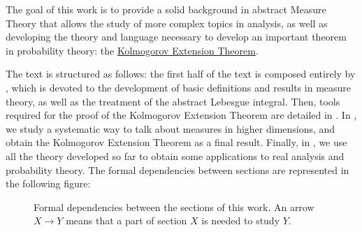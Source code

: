 The goal of this work is to provide a solid background in abstract Measure Theory that allows the study of more complex topics in analysis, as well as developing the theory and language necessary to develop an important theorem in probability theory: the \hyperref[theorem:Kolmogorov Extension]{Kolmogorov Extension Theorem}.


The text is structured as follows: the first half of the text is composed entirely by , which is devoted to the development of basic definitions and results in measure theory, as well as the treatment of the abstract Lebesgue integral. Then, tools required for the proof of the Kolmogorov Extension Theorem are detailed in . In , we study a systematic way to talk about measures in higher dimensions, and obtain the Kolmogorov Extension Theorem as a final result. Finally, in , we use all the theory developed so far to obtain some applications to real analysis and probability theory. The formal dependencies between sections are represented in the following figure:

\begin{figure}[h!]
\centering
{}
\caption{Formal dependencies between the sections of this work. An arrow \(X\to Y\) means that a part of section \(X\) is needed to study \(Y\).}
\end{figure}


